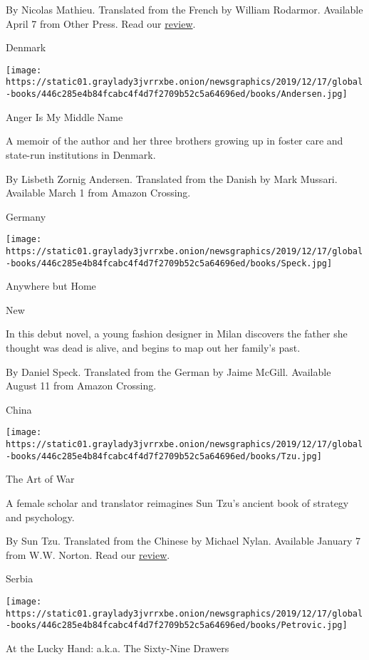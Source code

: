  By Nicolas Mathieu. Translated from the French by William Rodarmor.
Available April 7 from Other Press. Read our
\href{https://www.nytimes3xbfgragh.onion/2020/04/07/books/review/nicolas-mathieu-their-children-after-them.html}{review}.

Denmark

\texttt{[image: https://static01.graylady3jvrrxbe.onion/newsgraphics/2019/12/17/global-books/446c285e4b84fcabc4f4d7f2709b52c5a64696ed/books/Andersen.jpg]}

Anger Is My Middle Name

A memoir of the author and her three brothers growing up in foster care
and state-run institutions in Denmark.

 By Lisbeth Zornig Andersen. Translated from the Danish by Mark Mussari.
Available March 1 from Amazon Crossing.

Germany

\texttt{[image: https://static01.graylady3jvrrxbe.onion/newsgraphics/2019/12/17/global-books/446c285e4b84fcabc4f4d7f2709b52c5a64696ed/books/Speck.jpg]}

Anywhere but Home

New

In this debut novel, a young fashion designer in Milan discovers the
father she thought was dead is alive, and begins to map out her family's
past.

 By Daniel Speck. Translated from the German by Jaime McGill. Available
August 11 from Amazon Crossing.

China

\texttt{[image: https://static01.graylady3jvrrxbe.onion/newsgraphics/2019/12/17/global-books/446c285e4b84fcabc4f4d7f2709b52c5a64696ed/books/Tzu.jpg]}

The Art of War

A female scholar and translator reimagines Sun Tzu's ancient book of
strategy and psychology.

 By Sun Tzu. Translated from the Chinese by Michael Nylan. Available
January 7 from W.W. Norton. Read our
\href{https://www.nytimes3xbfgragh.onion/2019/12/23/books/review-art-of-war-sun-tzu-new-translation-michael-nylan.html}{review}.

Serbia

\texttt{[image: https://static01.graylady3jvrrxbe.onion/newsgraphics/2019/12/17/global-books/446c285e4b84fcabc4f4d7f2709b52c5a64696ed/books/Petrovic.jpg]}

At the Lucky Hand: a.k.a. The Sixty-Nine Drawers

